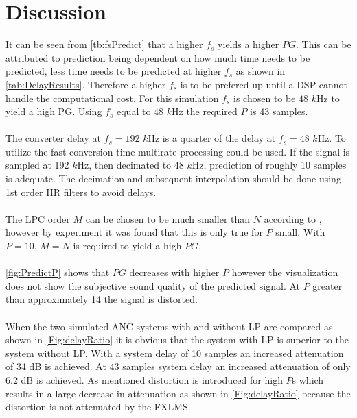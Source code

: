\section{Discussion} \label{sec:discussion}
It can be seen from \autoref{tb:fsPredict} that a higher $f_s$ yields a higher $PG$. This can be attributed to prediction being dependent on how much time needs to be predicted, less time needs to be predicted at higher $f_s$ as shown in \autoref{tab:DelayResults}.  
Therefore a higher $f_s$ is to be prefered up until a DSP cannot handle the computational cost. For this simulation $f_s$ is chosen to be $48$ $k$Hz to yield a high PG. 
Using $f_s$ equal to $48$ $k$Hz the required $P$ is 43 samples.  
\\\\
The converter delay at $f_s=192$ $k$Hz is a quarter of the delay at $f_s=48$ $k$Hz. To utilize the fast conversion time multirate processing could be used. If the signal is sampled at 192 $k$Hz, then decimated to 48 $k$Hz, prediction of roughly 10 samples is adequate. The decimation and subsequent interpolation should be done using 1st order IIR filters to avoid delays.  
\\\\
The LPC order $M$ can be chosen to be much smaller than $N$ according to \cite{Speech}, however by experiment it was found that this is only true for $P$ small. With $P=10$, $M=N$ is required to yield a high $PG$. 
\\\\
\autoref{fig:PredictP} shows that $PG$ decreases with higher $P$ however the visualization does not show the subjective sound quality of the predicted signal. At $P$ greater than approximately 14 the signal is distorted.    
\\\\
When the two simulated ANC systems with and without LP are compared as shown in \autoref{Fig:delayRatio} it is obvious that the system with LP is superior to the system without LP. With a system delay of 10 samples an increased attenuation of 34 dB is achieved. At 43 samples system delay an increased attenuation of only 6.2 dB is achieved. As mentioned distortion is introduced for high $P$s which results in a large decrease in attenuation as shown in \autoref{Fig:delayRatio} because the distortion is not attenuated by the FXLMS.
